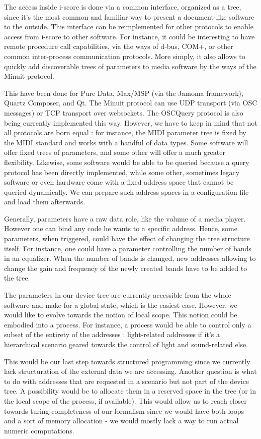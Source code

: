 \documentclass{sigchi}
\begin{document}
The access inside i-score is done via a common interface, organized as a tree, since it's the most common and familiar way to present a document-like software to the outside.
This interface can be reimplemented for other protocols to enable access from i-score to other software. For instance, it could be interesting to have remote procedure call capabilities, via the ways of d-bus, COM+, or other common inter-process communication protocols. More simply, it also allows to quickly add discoverable trees of parameters to media software by the ways of the Minuit %
protocol. 

This have been done for Pure Data, Max/MSP (via the Jamoma framework), Quartz Composer, and Qt. The Minuit protocol can use UDP transport (via OSC messages) or TCP transport over websockets. The OSCQuery %
protocol is also being currently implemented this way. However, we have to keep in mind that not all protocols are born equal : for instance, the MIDI parameter tree is fixed by the MIDI standard and works with a handful of data types. Some software will offer fixed trees of parameters, and some other will offer a much greater flexibility. Likewise, some software would be able to be queried because a query protocol has been directly implemented, while some other, sometimes legacy software or even hardware come with a fixed address space that cannot be queried dynamically. We can prepare such address spaces in a configuration file and load them afterwards.

Generally, parameters have a raw data role, like the volume of a media player. However one can bind any code he wants to a specific address. Hence, some parameters, when triggered, could have the effect of changing the tree structure itself. For instance, one could have a parameter controlling the number of bands in an equalizer. When the number of bands is changed, new addresses allowing to change the gain and frequency of the newly created bands have to be added to the tree.

The parameters in our device tree are currently accessible from the whole software and make for a global state, which is the easiest case. However, we would like to evolve towards the notion of local scope. This notion could be embodied into a process. For instance, a process would be able to control only a subset of the entirety of the addresses : light-related addresses if it's a hierarchical scenario geared towards the control of light and sound-related else.  

This would be our last step towards structured programming since we currently lack structuration of the external data we are accessing. Another question is what to do with addresses that are requested in a scenario but not part of the device tree. A possibility would be to allocate them in a reserved space in the tree (or in the local scope of the process, if available). This would allow us to reach closer towards turing-completeness of our formalism since we would have both loops and a sort of memory allocation - we would mostly lack a way to run actual numeric computations.
\end{document}
